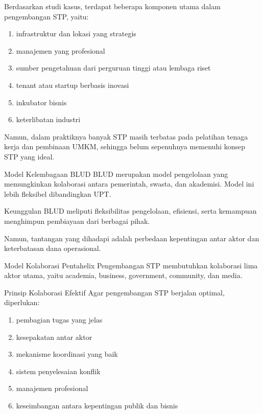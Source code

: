 \documentclass[../wastek.tex]{subfiles}
\begin{document}
Berdasarkan studi kasus, terdapat beberapa komponen utama dalam pengembangan STP, yaitu:

\begin{enumerate}
	\item infrastruktur dan lokasi yang strategis
	\item manajemen yang profesional
	\item sumber pengetahuan dari perguruan tinggi atau lembaga riset
	\item tenant atau startup berbasis inovasi
	\item inkubator bisnis
	\item keterlibatan industri
\end{enumerate}

Namun, dalam praktiknya banyak STP masih terbatas pada pelatihan tenaga kerja dan pembinaan UMKM, sehingga belum sepenuhnya memenuhi konsep STP yang ideal.

\tabitem Model Kelembagaan BLUD
BLUD merupakan model pengelolaan yang memungkinkan kolaborasi antara pemerintah, swasta, dan akademisi. Model ini lebih fleksibel dibandingkan UPT.

Keunggulan BLUD meliputi fleksibilitas pengelolaan, efisiensi, serta kemampuan menghimpun pembiayaan dari berbagai pihak.

Namun, tantangan yang dihadapi adalah perbedaan kepentingan antar aktor dan keterbatasan dana operasional.

\tabitem Model Kolaborasi Pentahelix
Pengembangan STP membutuhkan kolaborasi lima aktor utama, yaitu academia, business, government, community, dan media.

\tabitem Prinsip Kolaborasi Efektif
Agar pengembangan STP berjalan optimal, diperlukan:
\begin{enumerate}
	\item pembagian tugas yang jelas
	\item kesepakatan antar aktor
	\item mekanisme koordinasi yang baik
	\item sistem penyelesaian konflik
	\item manajemen profesional
	\item keseimbangan antara kepentingan publik dan bisnis
\end{enumerate}





\end{document}
